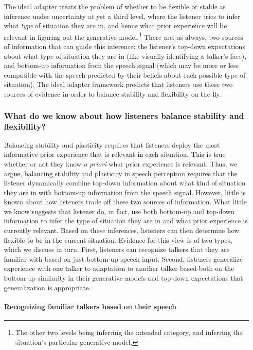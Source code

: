 The ideal adapter treats the problem of whether to be flexible or stable as inference under uncertainty at yet a third level, where the listener tries to infer what \emph{type} of situation they are in, and hence what prior experience will be relevant in figuring out the generative model.\footnote{The other two levels being inferring the intended category, and inferring the situation's particular generative model.}  There are, as always, two sources of information that can guide this inference: the listener's top-down expectations about what type of situation they are in (like visually identifying a talker's face), and bottom-up information from the speech signal (which may be more or less compatible with the speech predicted by their beliefs about each possible type of situation).  The ideal adapter framework predicts that listeners use these two sources of evidence in order to balance stability and flexibility on the fly.

\subsubsection{What do we know about how listeners balance stability and flexibility?}
\label{sec:what-do-we}

Balancing stability and plasticity requires that listeners deploy the most informative prior experience that is relevant in each situation.  This is true whether or not they know \emph{a priori} what prior experience is relevant.  Thus, we argue, balancing stability and plasticity in speech perception requires that the listener dynamically combine top-down information about what kind of situation they are in with bottom-up information from the speech signal.  However, little is known about how listeners trade off these two sources of information.  What little we know suggests that listener do, in fact, use both bottom-up and top-down information to infer the type of situation they are in and what prior experience is currently relevant. Based on these inferences, listeners can then determine how flexible to be in the current situation. Evidence for this view is of two types, which we discuss in turn.  First, listeners can recognize talkers that they are familiar with based on just bottom-up speech input.  Second, listeners generalize experience with one talker to adaptation to another talker based both on the bottom-up similarity in their generative models and top-down expectations that generalization is appropriate.  

\paragraph{Recognizing familiar talkers based on their speech}
\label{sec:recogn-famil-talk-1}

